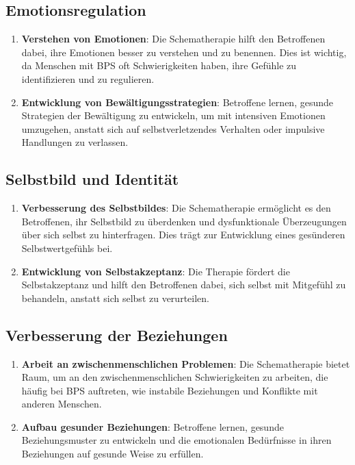\subsection{Emotionsregulation}

\begin{enumerate}
\item \textbf{Verstehen von Emotionen}: Die Schematherapie hilft den Betroffenen dabei, ihre Emotionen besser zu verstehen und zu benennen. Dies ist wichtig, da Menschen mit BPS oft Schwierigkeiten haben, ihre Gefühle zu identifizieren und zu regulieren.

\item \textbf{Entwicklung von Bewältigungsstrategien}: Betroffene lernen, gesunde Strategien der Bewältigung zu entwickeln, um mit intensiven Emotionen umzugehen, anstatt sich auf selbstverletzendes Verhalten oder impulsive Handlungen zu verlassen.
\end{enumerate}

\subsection{Selbstbild und Identität}

\begin{enumerate}
\item \textbf{Verbesserung des Selbstbildes}: Die Schematherapie ermöglicht es den Betroffenen, ihr Selbstbild zu überdenken und dysfunktionale Überzeugungen über sich selbst zu hinterfragen. Dies trägt zur Entwicklung eines gesünderen Selbstwertgefühls bei.

\item \textbf{Entwicklung von Selbstakzeptanz}: Die Therapie fördert die Selbstakzeptanz und hilft den Betroffenen dabei, sich selbst mit Mitgefühl zu behandeln, anstatt sich selbst zu verurteilen.
\end{enumerate}

\subsection{Verbesserung der Beziehungen}

\begin{enumerate}
\item \textbf{Arbeit an zwischenmenschlichen Problemen}: Die Schematherapie bietet Raum, um an den zwischenmenschlichen Schwierigkeiten zu arbeiten, die häufig bei BPS auftreten, wie instabile Beziehungen und Konflikte mit anderen Menschen.

\item \textbf{Aufbau gesunder Beziehungen}: Betroffene lernen, gesunde Beziehungsmuster zu entwickeln und die emotionalen Bedürfnisse in ihren Beziehungen auf gesunde Weise zu erfüllen.
\end{enumerate}

